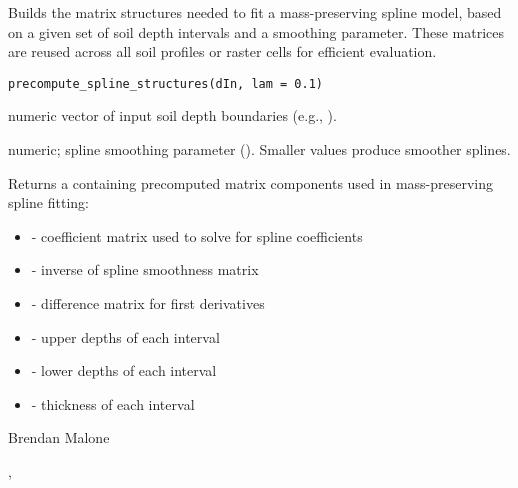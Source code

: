 \documentclass[a4paper]{book}
\begin{document}
%
\begin{Description}
Builds the matrix structures needed to fit a mass-preserving spline model, based on a given set of soil depth intervals and a smoothing parameter.
These matrices are reused across all soil profiles or raster cells for efficient evaluation.
\end{Description}
%
\begin{Usage}
\begin{verbatim}
precompute_spline_structures(dIn, lam = 0.1)
\end{verbatim}
\end{Usage}
%
\begin{Arguments}
\begin{ldescription}
\item[\code{dIn}] numeric vector of input soil depth boundaries (e.g., ).
\item[\code{lam}] numeric; spline smoothing parameter (\eqn{\lambda}{}). Smaller values produce smoother splines.
\end{ldescription}
\end{Arguments}
%
\begin{Value}
Returns a  containing precomputed matrix components used in mass-preserving spline fitting:
\begin{itemize}

\item{}  - coefficient matrix used to solve for spline coefficients
\item{}  - inverse of spline smoothness matrix
\item{}  - difference matrix for first derivatives
\item{}  - upper depths of each interval
\item{}  - lower depths of each interval
\item{}  - thickness of each interval

\end{itemize}

\end{Value}
%
\begin{Author}
Brendan Malone
\end{Author}
%
\begin{SeeAlso}
, 
\end{SeeAlso}
\end{document}
